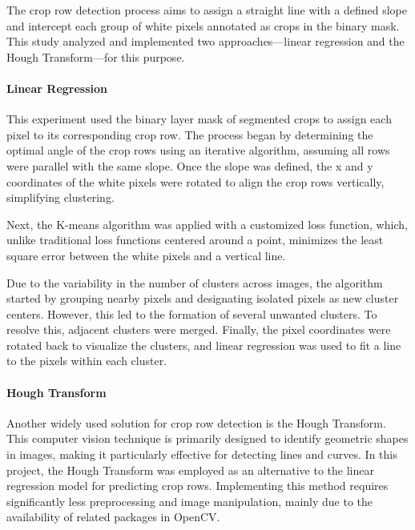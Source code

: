 \documentclass[conference]{IEEEtran}
\begin{document}
	The crop row detection process aims to assign a straight line with a defined slope and intercept each group of white pixels annotated as crops in the binary mask. This study analyzed and implemented two approaches—linear regression and the Hough Transform—for this purpose.
	
	\paragraph{Linear Regression}\label{Linear Regression}\leavevmode
	
	This experiment used the binary layer mask of segmented crops to assign each pixel to its corresponding crop row. The process began by determining the optimal angle of the crop rows using an iterative algorithm, assuming all rows were parallel with the same slope. Once the slope was defined, the x and y coordinates of the white pixels were rotated to align the crop rows vertically, simplifying clustering.
	
	Next, the K-means algorithm was applied with a customized loss function, which, unlike traditional loss functions centered around a point, minimizes the least square error between the white pixels and a vertical line. 
	
	Due to the variability in the number of clusters across images, the algorithm started by grouping nearby pixels and designating isolated pixels as new cluster centers. However, this led to the formation of several unwanted clusters. To resolve this, adjacent clusters were merged. Finally, the pixel coordinates were rotated back to visualize the clusters, and linear regression was used to fit a line to the pixels within each cluster.
	
	
	\paragraph{Hough Transform}\label{Hough Transform}\leavevmode
	
	Another widely used solution for crop row detection is the Hough Transform. This computer vision technique is primarily designed to identify geometric shapes in images, making it particularly effective for detecting lines and curves. In this project, the Hough Transform was employed as an alternative to the linear regression model for predicting crop rows. Implementing this method requires significantly less preprocessing and image manipulation, mainly due to the availability of related packages in OpenCV.
	
\end{document}

